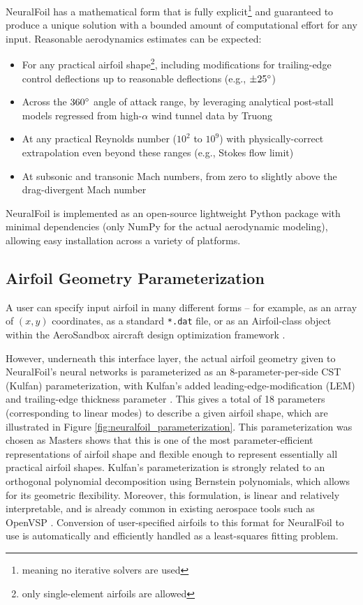 \documentclass[conf]{new-aiaa}
\begin{document}
    NeuralFoil has a mathematical form that is fully explicit\footnote{meaning no iterative solvers are used} and guaranteed to produce a unique solution with a bounded amount of computational effort for any input. Reasonable aerodynamics estimates can be expected:
    \begin{itemize}
        \item For any practical airfoil shape\footnote{only single-element airfoils are allowed}, including modifications for trailing-edge control deflections up to reasonable deflections (e.g., $\pm 25\degree$)
        \item Across the $360\degree$ angle of attack range, by leveraging analytical post-stall models regressed from high-$\alpha$ wind tunnel data by Truong \cite{truong_analytical_2020}
        \item At any practical Reynolds number ($10^2$ to $10^9$) with physically-correct extrapolation even beyond these ranges (e.g., Stokes flow limit)
        \item At subsonic and transonic Mach numbers, from zero to slightly above the drag-divergent Mach number
    \end{itemize}

    NeuralFoil is implemented as an open-source lightweight Python package with minimal dependencies (only NumPy \cite{harris_array_2020} for the actual aerodynamic modeling), allowing easy installation across a variety of platforms.

    \subsection{Airfoil Geometry Parameterization}
    \label{sec:airfoil-parameterization}

    A user can specify input airfoil in many different forms -- for example, as an array of $(x, y)$ coordinates, as a standard \texttt{*.dat} file, or as an Airfoil-class object within the AeroSandbox aircraft design optimization framework \cite{sharpe_aerosandbox_2021}.

    However, underneath this interface layer, the actual airfoil geometry given to NeuralFoil's neural networks is parameterized as an 8-parameter-per-side CST (Kulfan) parameterization, with Kulfan's added leading-edge-modification (LEM) and trailing-edge thickness parameter \cite{kulfan_universal_2008, kulfan_modification_2020}. This gives a total of 18 parameters (corresponding to linear modes) to describe a given airfoil shape, which are illustrated in Figure \ref{fig:neuralfoil_parameterization}. This parameterization was chosen as Masters \cite{masters_geometric_2017} shows that this is one of the most parameter-efficient representations of airfoil shape and flexible enough to represent essentially all practical airfoil shapes. Kulfan's parameterization is strongly related to an orthogonal polynomial decomposition using Bernstein polynomials, which allows for its geometric flexibility. Moreover, this formulation, is linear and relatively interpretable, and is already common in existing aerospace tools such as OpenVSP \cite{mcdonald_open_2022}. Conversion of user-specified airfoils to this format for NeuralFoil to use is automatically and efficiently handled as a least-squares fitting problem.
\end{document}
